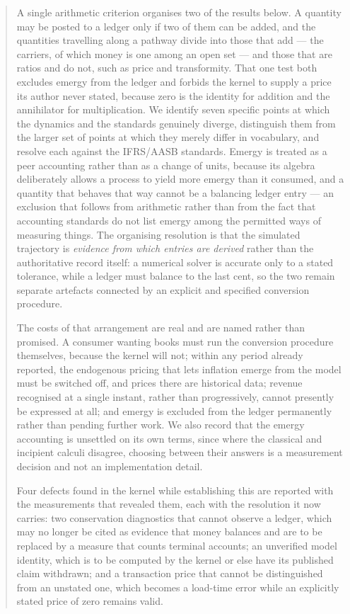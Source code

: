 \documentclass[11pt,a4paper]{article}
\begin{document}
\begin{abstract}
A single arithmetic criterion organises two of the results below. A quantity may be posted to a ledger only if two of them can be added, and the quantities travelling along a pathway divide into those that add --- the carriers, of which money is one among an open set --- and those that are ratios and do not, such as price and transformity. That one test both excludes emergy from the ledger and forbids the kernel to supply a price its author never stated, because zero is the identity for addition and the annihilator for multiplication. We identify seven specific points at which the dynamics and the standards genuinely diverge, distinguish them from the larger set of points at which they merely differ in vocabulary, and resolve each against the IFRS/AASB standards. Emergy is treated as a peer accounting rather than as a change of units, because its algebra deliberately allows a process to yield more emergy than it consumed, and a quantity that behaves that way cannot be a balancing ledger entry --- an exclusion that follows from arithmetic rather than from the fact that accounting standards do not list emergy among the permitted ways of measuring things. The organising resolution is that the simulated trajectory is \emph{evidence from which entries are derived} rather than the authoritative record itself: a numerical solver is accurate only to a stated tolerance, while a ledger must balance to the last cent, so the two remain separate artefacts connected by an explicit and specified conversion procedure.

The costs of that arrangement are real and are named rather than promised. A consumer wanting books must run the conversion procedure themselves, because the kernel will not; within any period already reported, the endogenous pricing that lets inflation emerge from the model must be switched off, and prices there are historical data; revenue recognised at a single instant, rather than progressively, cannot presently be expressed at all; and emergy is excluded from the ledger permanently rather than pending further work. We also record that the emergy accounting is unsettled on its own terms, since where the classical and incipient calculi disagree, choosing between their answers is a measurement decision and not an implementation detail.

Four defects found in the kernel while establishing this are reported with the measurements that revealed them, each with the resolution it now carries: two conservation diagnostics that cannot observe a ledger, which may no longer be cited as evidence that money balances and are to be replaced by a measure that counts terminal accounts; an unverified model identity, which is to be computed by the kernel or else have its published claim withdrawn; and a transaction price that cannot be distinguished from an unstated one, which becomes a load-time error while an explicitly stated price of zero remains valid.
\end{abstract}
\end{document}
